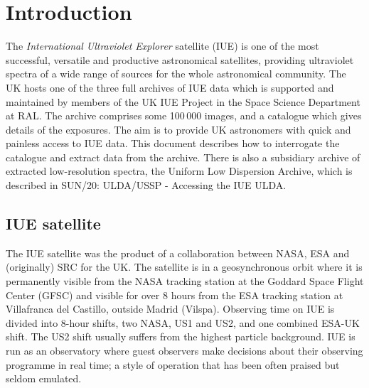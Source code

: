 \documentclass[11pt,twoside]{article}
\newcommand{\stardocinitials}  {SUN}
\newcommand{\stardocnumber}    {58.7}
\newcommand{\stardocname}{\stardocinitials /\stardocnumber}
\newenvironment{latexonly}{}{}
\newcommand{\xref}[3]{#1}
\newcommand{\xlabel}[1]{}
\renewcommand{\thepage}{\roman{page}}
\begin{document}
\newpage
\begin{latexonly}
   \setlength{\parskip}{0mm}
   \tableofcontents
   \setlength{\parskip}{\medskipamount}
   \markright{\stardocname}
\end{latexonly}
\newpage
\renewcommand{\thepage}{\arabic{page}}
\setcounter{page}{1}

\section {Introduction\xlabel{introduction}}

The {\it International Ultraviolet Explorer\/} satellite (IUE) is one of the
most successful, versatile and productive astronomical satellites, providing
ultraviolet spectra of a wide range of sources for the whole astronomical
community.
The UK hosts one of the three full archives of IUE data
which is supported and maintained by members of the UK IUE
Project in the Space Science Department at RAL.
The archive comprises some 100\,000 images,
and a catalogue which gives details of the exposures.
The aim is to provide UK astronomers with quick and painless
access to IUE data.
This document describes how to interrogate the catalogue and extract data from
the archive.
There is also a subsidiary archive of extracted low-resolution spectra, the
Uniform Low Dispersion Archive,
which is described in
\xref{SUN/20}{sun20}{}: ULDA/USSP - Accessing the IUE ULDA.

\subsection {IUE satellite}
The IUE satellite was the product
of a collaboration between NASA, ESA and (originally) SRC for the UK.
The satellite is in a geosynchronous orbit where it is permanently visible from
the NASA tracking station at the Goddard Space Flight Center (GFSC) and visible
for over 8 hours from the ESA tracking station at Villafranca del Castillo,
outside Madrid (Vilspa).
Observing time on IUE is divided into 8-hour shifts, two NASA, US1
and US2, and one combined ESA-UK shift.
The US2 shift usually suffers from the highest particle background.
IUE is run as an observatory where guest observers make decisions
about their observing programme in real time; a style of operation
that has been often praised but seldom emulated.
\end{document}
